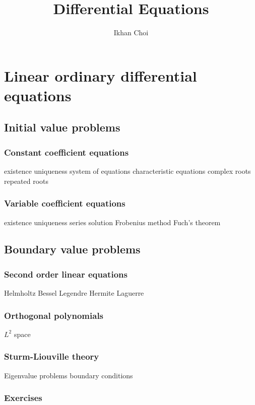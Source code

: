 \documentclass{../../large}
\begin{document}
\title{Differential Equations}
\author{Ikhan Choi}
\maketitle
\tableofcontents


\part{Linear ordinary differential equations}


\chapter{Initial value problems}
\section{Constant coefficient equations}
existence uniqueness system of equations
characteristic equations
complex roots
repeated roots


\section{Variable coefficient equations}
existence uniqueness
series solution
Frobenius method
Fuch's theorem




\chapter{Boundary value problems}
\section{Second order linear equations}
Helmholtz
Bessel
Legendre
Hermite
Laguerre

\section{Orthogonal polynomials}
$L^2$ space

\section{Sturm-Liouville theory}
Eigenvalue problems
boundary conditions

\section*{Exercises}
\begin{prb}
\end{prb}
\end{document}
